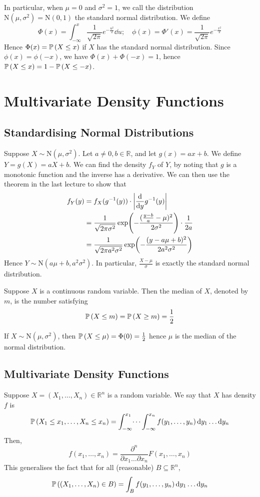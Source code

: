 \documentclass{article}
\begin{document}
In particular, when $\mu = 0$ and $\sigma^2 = 1$, we call the distribution $\mathrm{N}(\mu, \sigma^2) = \mathrm{N}(0, 1)$ the standard normal distribution. We define
\[ \Phi(x) = \int_{-\infty}^x \frac{1}{\sqrt{2\pi}} e^{-\frac{u^2}{2}} \dd{u};\quad \phi(x) = \Phi'(x) = \frac{1}{\sqrt{2\pi}} e^{-\frac{x^2}{2}} \]
Hence $\Phi(x) = \mathbb{P}\left({X \leq x}\right)$ if $X$ has the standard normal distribution. Since $\phi(x) = \phi(-x)$, we have $\Phi(x) + \Phi(-x) = 1$, hence $\mathbb{P}\left({X \leq x}\right) = 1 - \mathbb{P}\left({X \leq -x}\right)$.

\section{Multivariate Density Functions}
\subsection{Standardising Normal Distributions}
Suppose $X \sim \mathrm{N}(\mu, \sigma^2)$. Let $a \neq 0, b \in \mathbb R$, and let $g(x) = ax+b$. We define $Y = g(X) = aX+b$. We can find the density $f_Y$ of $Y$, by noting that $g$ is a monotonic function and the inverse has a derivative. We can then use the theorem in the last lecture to show that
\begin{align*}
    f_Y(y) & = f_X(g^{-1}(y)) \cdot \abs{\dv{y} g^{-1}(y)}                                                       \\
           & = \frac{1}{\sqrt{2\pi\sigma^2}} \exp(-\frac{(\frac{y-b}{a} - \mu)^2}{2\sigma^2}) \cdot \frac{1}{2a} \\
           & =\frac{1}{\sqrt{2\pi a^2\sigma^2}} \exp(-\frac{(y - a\mu + b)^2}{2 a^2 \sigma^2})
\end{align*}
Hence $Y \sim \mathrm{N}(a \mu + b, a^2 \sigma^2)$. In particular, $\frac{X-\mu}{\sigma}$ is exactly the standard normal distribution.
\begin{definition}
    Suppose $X$ is a continuous random variable. Then the median of $X$, denoted by $m$, is the number satisfying
    \[ \mathbb{P}\left({X \leq m}\right) = \mathbb{P}\left({X \geq m}\right) = \frac{1}{2} \]
\end{definition}
\noindent If $X \sim \mathrm{N}(\mu, \sigma^2)$, then $\mathbb{P}\left({X \leq \mu}\right) = \Phi(0) = \frac{1}{2}$ hence $\mu$ is the median of the normal distribution.

\subsection{Multivariate Density Functions}
Suppose $X = (X_1, \dots, X_n) \in \mathbb R^n$ is a random variable. We say that $X$ has density $f$ is
\[ \mathbb{P}\left({X_1 \leq x_1, \dots, X_n \leq x_n}\right) = \int_{-\infty}^{x_1} \dots \int_{-\infty}^{x_n}  f(y_1, \dots, y_n) \dd{y_1} \dots \dd{y_n} \]
Then,
\[ f(x_1, \dots, x_n) = \frac{\partial^n}{\partial x_1 \dots \partial x_n} F(x_1, \dots, x_n) \]
This generalises the fact that for all (reasonable) $B \subseteq \mathbb R^n$,
\[ \mathbb{P}\left({(X_1, \dots, X_n) \in B}\right) = \int_B f(y_1, \dots, y_n) \dd{y_1}\dots\dd{y_n} \]
\end{document}
